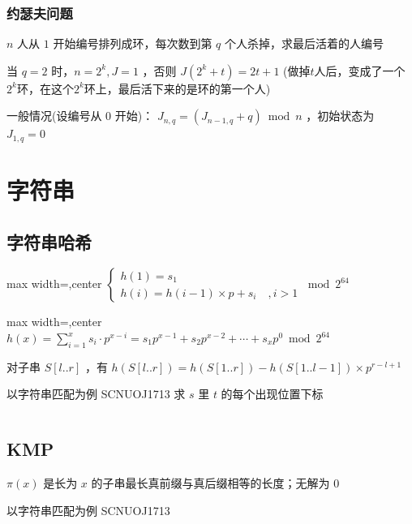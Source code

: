 \documentclass[twocolumn,10pt]{ctexart}
\begin{document}
\subsubsection{约瑟夫问题}

$n$ 人从 $1$ 开始编号排列成环，每次数到第 $q$ 个人杀掉，求最后活着的人编号

当 $q=2$ 时，$n=2^k, J=1$ ，否则 $J(2^k+t)=2t+1$ (做掉$t$人后，变成了一个$2^k$环，在这个$2^k$环上，最后活下来的是环的第一个人)

一般情况(设编号从 $0$ 开始)： $J_{n,q}=(J_{n-1,q}+q)\bmod n$ ，初始状态为 $J_{1,q}=0$

\section{字符串}

\subsection{字符串哈希}

\begin{adjustbox}{max width=\linewidth,center}
$\begin{cases}
h(1)=s_1\\
h(i)=h(i-1)\times p+s_i\quad ,i > 1
\end{cases}\bmod2^{64}$
\end{adjustbox}

\begin{adjustbox}{max width=\linewidth,center}
$h(x)=\sum_{i=1}^{x}s_i\cdot p^{x-i}=s_1p^{x-1}+s_2p^{x-2}+\cdots +s_xp^0\bmod2^{64}$
\end{adjustbox}

对子串 $S[l..r]$ ，有  $h(S[l..r])=h(S[1..r])-h(S[1..l-1])\times p^{r-l+1}$

\begin{notebox}
以字符串匹配为例 SCNUOJ1713 求 $s$ 里 $t$ 的每个出现位置下标
\end{notebox}

\inputminted{cpp}{code/ext_056.cpp}

\subsection{KMP}

$\pi(x)$ 是长为 $x$ 的子串最长真前缀与真后缀相等的长度；无解为 $0$

\begin{notebox}
以字符串匹配为例 SCNUOJ1713
\end{notebox}
\end{document}

